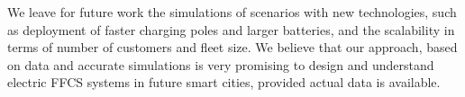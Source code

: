 


We leave for future work the simulations of scenarios with new technologies, such as deployment of faster charging poles and larger batteries, and the scalability in terms of number of customers and fleet size.
We believe that our approach, based on data and accurate simulations is very promising to design and understand electric FFCS systems in future smart cities, provided actual data is available.
